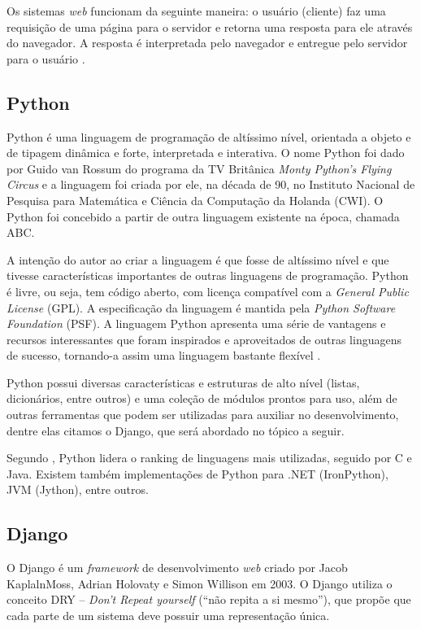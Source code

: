 \documentclass[
	12pt,				%
    oneside,			%
	a4paper,			%
	english,			%
	french,				%
	spanish,			%
	brazil,				%
	]{abntex2}
\begin{document}
Os sistemas \textit{web} funcionam da seguinte maneira: o usuário (cliente) faz uma
requisição de uma página para o servidor e retorna uma resposta para ele através do
navegador. A resposta é interpretada pelo navegador e entregue pelo servidor para o
usuário \cite{niederauer}.

\subsection{Python}

Python é uma linguagem de programação de altíssimo nível, orientada a objeto
e de tipagem dinâmica e forte, interpretada e interativa. O nome Python foi dado por
Guido van Rossum do programa da TV Britânica \textit{Monty Python’s Flying Circus} e a
linguagem foi criada por ele, na década de 90, no Instituto Nacional de Pesquisa para
Matemática e Ciência da Computação da Holanda (CWI). O Python foi concebido a
partir de outra linguagem existente na época, chamada ABC.

A intenção do autor ao criar a linguagem é que fosse de altíssimo nível e que
tivesse características importantes de outras linguagens de programação. Python é
livre, ou seja, tem código aberto, com licença compatível com a \textit{General Public License}
(GPL). A especificação da linguagem é mantida pela \textit{\textit{Python Software Foundation}}
(PSF). A linguagem Python apresenta uma série de vantagens e recursos
interessantes que foram inspirados e aproveitados de outras linguagens de sucesso,
tornando-a assim uma linguagem bastante flexível \cite{borges}.

Python possui diversas características e estruturas de alto nível (listas,
dicionários, entre outros) e uma coleção de módulos prontos para uso, além de outras
ferramentas que podem ser utilizadas para auxiliar no desenvolvimento, dentre elas
citamos o Django, que será abordado no tópico a seguir.

Segundo , Python lidera o ranking de linguagens
mais utilizadas, seguido por C e Java. Existem também implementações de Python
para .NET (IronPython), JVM (Jython), entre outros.

\subsection{Django}

O Django é um \textit{framework} de desenvolvimento \textit{web} criado por Jacob KaplalnMoss,
Adrian Holovaty e Simon Willison em 2003. O Django utiliza o conceito DRY –
\textit{Don’t Repeat yourself} (“não repita a si mesmo”), que propõe que cada parte de um
sistema deve possuir uma representação única.
\end{document}
